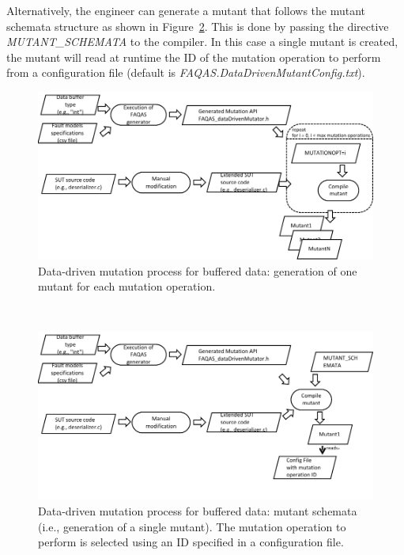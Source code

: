 Alternatively, the engineer can generate a mutant that follows the mutant schemata structure as shown in Figure~\ref{fig:DataDrivenBufferProcessALT}. This is done by passing the directive \emph{MUTANT\_SCHEMATA} to the compiler. In this case a single mutant is created, the mutant will read at runtime the ID of the mutation operation to perform from a configuration file (default is \emph{FAQAS.DataDrivenMutantConfig.txt}).


\begin{figure}[h]
  \centering
    \includegraphics[width=14cm]{images/dataDrivenBufferProcess}
      \caption{Data-driven mutation process for buffered data: generation of one mutant for each mutation operation.}
      \label{fig:DataDrivenBufferProcess}
\end{figure}~\begin{figure}[h]
  \centering
    \includegraphics[width=14cm]{images/dataDrivenBufferProcess_ALT}
      \caption{Data-driven mutation process for buffered data: mutant schemata (i.e., generation of a single mutant). The mutation operation to perform is selected using an ID specified in a configuration file.}
      \label{fig:DataDrivenBufferProcessALT}
\end{figure}

